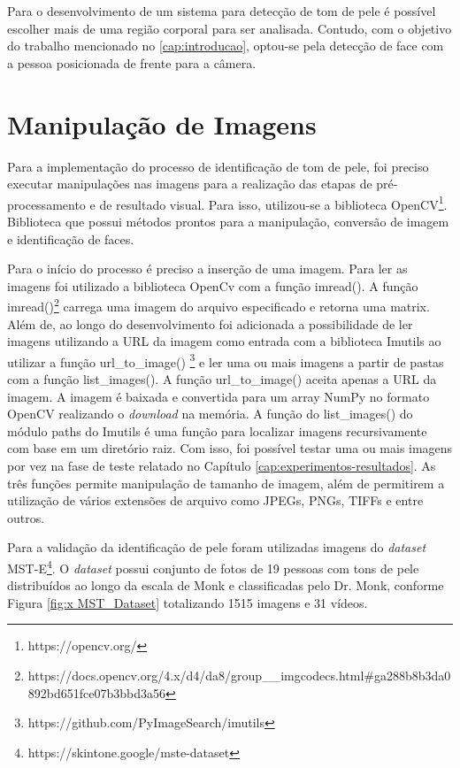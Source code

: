 Para o desenvolvimento de um sistema para detecção de tom de pele é possível escolher mais de uma região corporal para ser analisada. Contudo, com o objetivo do trabalho mencionado no \ref{cap:introducao}, optou-se pela detecção de face com a pessoa posicionada de frente para a câmera. 

\section{Manipulação de Imagens}
Para a implementação do processo de identificação de tom de pele, foi preciso executar manipulações nas imagens para a realização das etapas de pré-processamento e de resultado visual. Para isso, utilizou-se a biblioteca OpenCV\footnote{https://opencv.org/}. Biblioteca que possui métodos prontos para a manipulação, conversão de imagem e identificação de faces. 

Para o início do processo é preciso a inserção de uma imagem. Para ler as imagens foi utilizado a biblioteca OpenCv com a função imread(). A função imread()\footnote{https://docs.opencv.org/4.x/d4/da8/group\_\_imgcodecs.html\#ga288b8b3da0892bd651fce07b3bbd3a56} carrega uma imagem do arquivo especificado e retorna uma matrix. Além de, ao longo do desenvolvimento foi adicionada a possibilidade de ler imagens utilizando a URL da imagem como entrada com a biblioteca Imutils ao utilizar a função  url\_to\_image() \footnote{https://github.com/PyImageSearch/imutils} e ler uma ou mais imagens a partir de pastas com a função list\_images(). A função url\_to\_image() aceita apenas a URL da imagem. A imagem é baixada e convertida para um array NumPy no formato OpenCV realizando o \textit{download} na memória. A função do list\_images() do módulo paths do Imutils é uma função para localizar imagens recursivamente com base em um diretório raiz. Com isso, foi possível testar uma ou mais imagens por vez na fase de teste relatado no Capítulo \ref{cap:experimentos-resultados}. As três funções permite manipulação de tamanho de imagem, além de permitirem a utilização de vários extensões de arquivo como JPEGs, PNGs, TIFFs e entre outros.

Para a validação da identificação de pele foram utilizadas imagens do \textit{dataset} MST-E\footnote{https://skintone.google/mste-dataset}. O \textit{dataset} possui conjunto de fotos de 19 pessoas com tons de pele distribuídos ao longo da escala de Monk e classificadas pelo Dr. Monk, conforme Figura \ref{fig:x MST_Dataset} totalizando 1515 imagens e 31 vídeos. 

